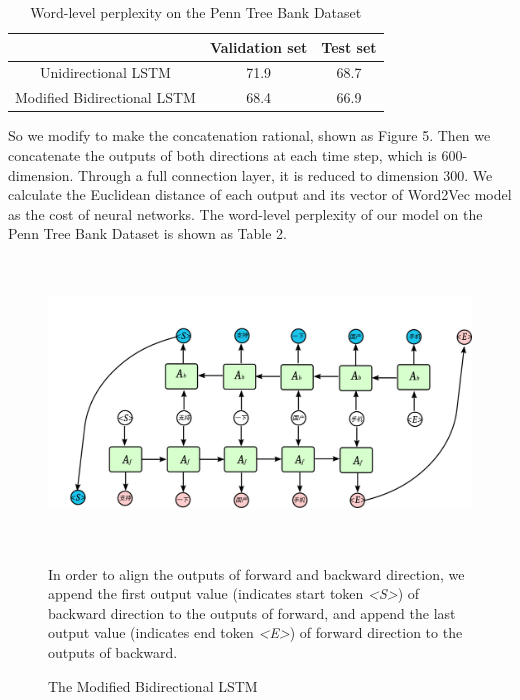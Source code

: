 \documentclass{sig-alternate}
\begin{document}
\begin{table}
\centering
\caption{Word-level perplexity on the Penn Tree Bank Dataset}
\label{tab:commands}
\begin{minipage}{\columnwidth}
\begin{center}
\begin{tabular}{c c c}
\hline
         &   Validation set &  Test set   \\ \hline
 Unidirectional LSTM & 71.9 & 68.7 \\ \hline
 Modified Bidirectional LSTM & 68.4 & 66.9 \\ \hline
\end{tabular}
\end{center}
\end{minipage}
\end{table}

So we modify to make the concatenation rational, shown as Figure 5. 
Then we concatenate the outputs of both directions at each time step, which 
is 600-dimension. Through a full connection layer, it is reduced to 
dimension 300. We calculate the Euclidean distance of each output and its 
vector of Word2Vec model as the cost of neural networks. The word-level perplexity of our model on the Penn Tree Bank Dataset is shown as Table 2.

\begin{figure}
  \centering
  \includegraphics[height=3in, width=6.21in]{bilstm2.png}
  \caption{The Modified Bidirectional LSTM}{In order to align the outputs of forward and backward direction, we append the first output value (indicates start token \emph{<S>}) of  
  backward direction to the outputs of forward, and append the last output value (indicates end token \emph{<E>}) of forward direction to the outputs of backward.}
\end{figure}
\end{document}
